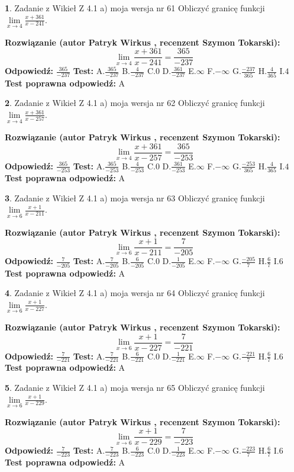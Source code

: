 \documentclass[12pt, a4paper]{article}
\theoremstyle{definition} %
\newtheorem{zad}{}
\newcommand{\zadStart}[1]{\begin{zad}#1\newline}
\newcommand{\zadStop}{\end{zad}}
\newcommand{\rozwStart}[2]{\noindent \textbf{Rozwiązanie (autor #1 , recenzent #2): }\newline}
\newcommand{\rozwStop}{\newline}
\newcommand{\odpStart}{\noindent \textbf{Odpowiedź:}\newline}
\newcommand{\odpStop}{\newline}
\newcommand{\testStart}{\noindent \textbf{Test:}\newline}
\newcommand{\testStop}{\newline}
\newcommand{\kluczStart}{\noindent \textbf{Test poprawna odpowiedź:}\newline}
\newcommand{\kluczStop}{\newline}
\begin{document}
\zadStart{Zadanie z Wikieł Z 4.1 a) moja wersja nr 61}
Obliczyć granicę funkcji $\lim\limits_{x\to4}\frac{x+361}{x-241}$.
\zadStop
\rozwStart{Patryk Wirkus}{Szymon Tokarski}
$$\lim\limits_{x\to4}\frac{x+361}{x-241} = \frac{365}{-237}$$
\rozwStop
\odpStart
$\frac{365}{-237}$
\odpStop
\testStart
A.$\frac{365}{-237}$
B.$\frac{4}{-237}$
C.$0$
D.$\frac{361}{-237}$
E.$\infty$
F.$-\infty$
G.$\frac{-237}{365}$
H.$\frac{4}{365}$
I.$4$
\testStop
\kluczStart
A
\kluczStop



\zadStart{Zadanie z Wikieł Z 4.1 a) moja wersja nr 62}
Obliczyć granicę funkcji $\lim\limits_{x\to4}\frac{x+361}{x-257}$.
\zadStop
\rozwStart{Patryk Wirkus}{Szymon Tokarski}
$$\lim\limits_{x\to4}\frac{x+361}{x-257} = \frac{365}{-253}$$
\rozwStop
\odpStart
$\frac{365}{-253}$
\odpStop
\testStart
A.$\frac{365}{-253}$
B.$\frac{4}{-253}$
C.$0$
D.$\frac{361}{-253}$
E.$\infty$
F.$-\infty$
G.$\frac{-253}{365}$
H.$\frac{4}{365}$
I.$4$
\testStop
\kluczStart
A
\kluczStop



\zadStart{Zadanie z Wikieł Z 4.1 a) moja wersja nr 63}
Obliczyć granicę funkcji $\lim\limits_{x\to6}\frac{x+1}{x-211}$.
\zadStop
\rozwStart{Patryk Wirkus}{Szymon Tokarski}
$$\lim\limits_{x\to6}\frac{x+1}{x-211} = \frac{7}{-205}$$
\rozwStop
\odpStart
$\frac{7}{-205}$
\odpStop
\testStart
A.$\frac{7}{-205}$
B.$\frac{6}{-205}$
C.$0$
D.$\frac{1}{-205}$
E.$\infty$
F.$-\infty$
G.$\frac{-205}{7}$
H.$\frac{6}{7}$
I.$6$
\testStop
\kluczStart
A
\kluczStop



\zadStart{Zadanie z Wikieł Z 4.1 a) moja wersja nr 64}
Obliczyć granicę funkcji $\lim\limits_{x\to6}\frac{x+1}{x-227}$.
\zadStop
\rozwStart{Patryk Wirkus}{Szymon Tokarski}
$$\lim\limits_{x\to6}\frac{x+1}{x-227} = \frac{7}{-221}$$
\rozwStop
\odpStart
$\frac{7}{-221}$
\odpStop
\testStart
A.$\frac{7}{-221}$
B.$\frac{6}{-221}$
C.$0$
D.$\frac{1}{-221}$
E.$\infty$
F.$-\infty$
G.$\frac{-221}{7}$
H.$\frac{6}{7}$
I.$6$
\testStop
\kluczStart
A
\kluczStop



\zadStart{Zadanie z Wikieł Z 4.1 a) moja wersja nr 65}
Obliczyć granicę funkcji $\lim\limits_{x\to6}\frac{x+1}{x-229}$.
\zadStop
\rozwStart{Patryk Wirkus}{Szymon Tokarski}
$$\lim\limits_{x\to6}\frac{x+1}{x-229} = \frac{7}{-223}$$
\rozwStop
\odpStart
$\frac{7}{-223}$
\odpStop
\testStart
A.$\frac{7}{-223}$
B.$\frac{6}{-223}$
C.$0$
D.$\frac{1}{-223}$
E.$\infty$
F.$-\infty$
G.$\frac{-223}{7}$
H.$\frac{6}{7}$
I.$6$
\testStop
\kluczStart
A
\kluczStop
\end{document}
